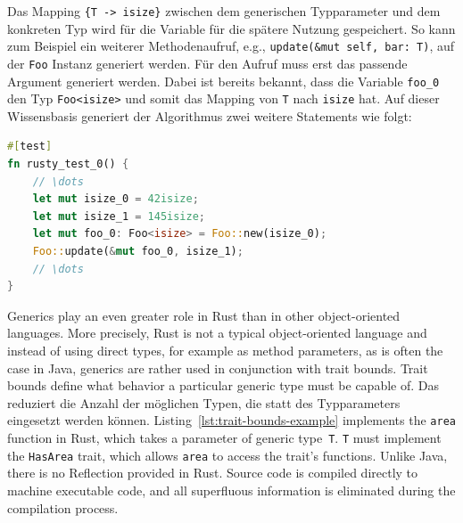 \documentclass{article}
\begin{document}
Das Mapping \lstinline|{T -> isize}| zwischen dem generischen Typparameter und dem konkreten Typ wird für die Variable für die spätere Nutzung gespeichert. So kann zum Beispiel ein weiterer Methodenaufruf, e.g., \lstinline{update(&mut self, bar: T)}, auf der \lstinline{Foo} Instanz generiert werden. Für den Aufruf muss erst das passende Argument generiert werden. Dabei ist bereits bekannt, dass die Variable \lstinline{foo_0} den Typ \lstinline{Foo<isize>} und somit das Mapping von \lstinline{T} nach \lstinline{isize} hat. Auf dieser Wissensbasis generiert der Algorithmus zwei weitere Statements wie folgt:
\begin{lstlisting}[language=Rust, style=boxed, caption={}, label=lst:building-generic-test-2]
#[test]
fn rusty_test_0() {
    // \dots
    let mut isize_0 = 42isize;
    let mut isize_1 = 145isize;
    let mut foo_0: Foo<isize> = Foo::new(isize_0);
    Foo::update(&mut foo_0, isize_1);
    // \dots
}
\end{lstlisting}


%
%
%


Generics play an even greater role in Rust than in other object-oriented languages. More precisely, Rust is not a typical object-oriented language and instead of using direct types, for example as method parameters, as is often the case in Java, generics are rather used in conjunction with trait bounds. Trait bounds define what behavior a particular generic type must be capable of. Das reduziert die Anzahl der möglichen Typen, die statt des Typparameters eingesetzt werden können. Listing~\ref{lst:trait-bounds-example} implements the \lstinline{area} function in Rust, which takes a parameter of generic type~\lstinline{T}. \lstinline{T} must implement the \lstinline{HasArea} trait, which allows \lstinline{area} to access the trait's functions. Unlike Java, there is no Reflection provided in Rust. Source code is compiled directly to machine executable code, and all superfluous information is eliminated during the compilation process.
\end{document}
